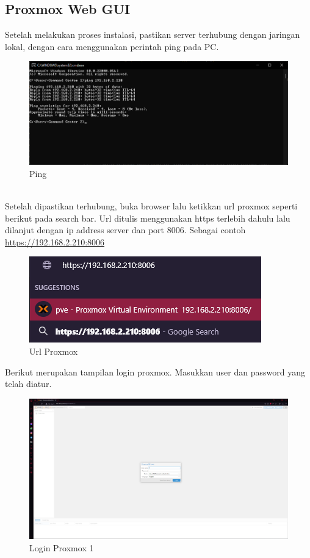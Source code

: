 \documentclass{article}
\begin{document}
  \subsection{Proxmox Web GUI}
  Setelah melakukan proses instalasi, pastikan server terhubung dengan jaringan lokal,
  dengan cara menggunakan perintah ping pada PC.
  \begin{figure}[h!]
    \centering
    \includegraphics[width=0.7\linewidth]{cmd.png}
    \caption{Ping}
  \end{figure}
  \\ Setelah dipastikan terhubung, buka browser lalu ketikkan url proxmox seperti berikut pada search bar.
  Url ditulis menggunakan https terlebih dahulu lalu dilanjut dengan ip address server dan port 8006. Sebagai contoh
  \url{https://192.168.2.210:8006}
  \begin{figure}[h!]
    \centering
    \includegraphics[width=0.7\linewidth]{url proxmox.png}
    \caption{Url Proxmox}
  \end{figure}
  \newpage
  Berikut merupakan tampilan login proxmox. Masukkan user dan password yang telah diatur.
  \begin{figure}[h!]
    \centering
    \includegraphics[width=0.7\linewidth]{login proxmox 1.png}
    \caption{Login Proxmox 1}
  \end{figure}
\end{document}
